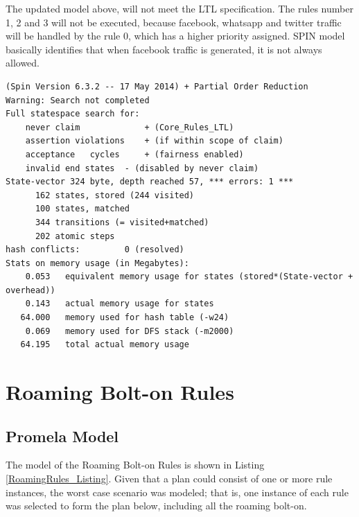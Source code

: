 The updated model above, will not meet the LTL specification. The rules number 1, 2 and 3 will not be executed, because facebook, whatsapp and twitter traffic will be handled by the rule 0, which has a higher priority assigned. SPIN model basically identifies that when facebook traffic is generated, it is not always allowed.

\singlespacing
\begin{lstlisting}[caption=Invalid Core-Rules Plan - Verification ,
  label=InvalidCoreResult]
(Spin Version 6.3.2 -- 17 May 2014) + Partial Order Reduction 
Warning: Search not completed 
Full statespace search for:
	never claim         	+ (Core_Rules_LTL)
	assertion violations	+ (if within scope of claim)
	acceptance   cycles 	+ (fairness enabled)
	invalid end states	- (disabled by never claim)
State-vector 324 byte, depth reached 57, *** errors: 1 ***
      162 states, stored (244 visited)
      100 states, matched
      344 transitions (= visited+matched)
      202 atomic steps
hash conflicts:         0 (resolved)
Stats on memory usage (in Megabytes):
    0.053	equivalent memory usage for states (stored*(State-vector + overhead))
    0.143	actual memory usage for states
   64.000	memory used for hash table (-w24)
    0.069	memory used for DFS stack (-m2000)
   64.195	total actual memory usage
\end{lstlisting}
\doublespacing
\section{Roaming Bolt-on Rules}
\subsection{Promela Model}
\noindent
The model of the Roaming Bolt-on Rules is shown in Listing \ref{RoamingRules_Listing}. Given that a plan could consist of one or more rule instances, the worst case scenario was modeled; that is, one instance of each rule was selected to form the plan below, including all the roaming bolt-on. 

